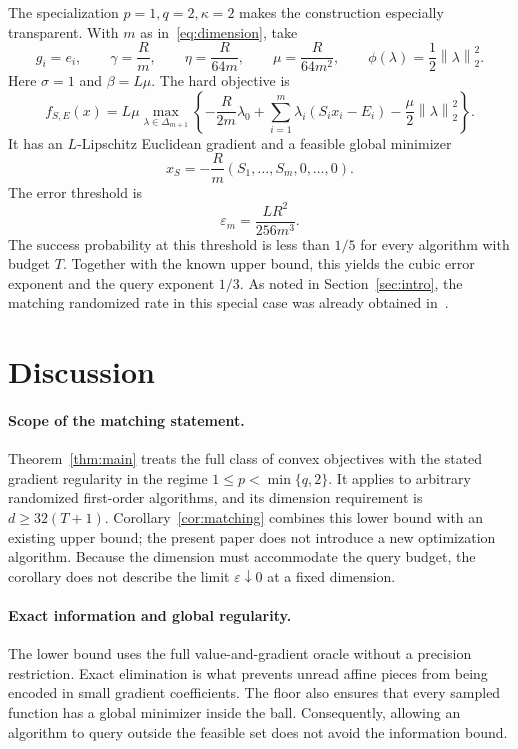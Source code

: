 \documentclass[11pt,a4paper]{article}
\theoremstyle{definition}
\theoremstyle{remark}
\newcommand{\eps}{\varepsilon}
\newcommand{\norm}[1]{\left\lVert #1\right\rVert}
\begin{document}
The specialization $p=1,q=2,\kappa=2$ makes the construction especially
transparent. With $m$ as in~\eqref{eq:dimension}, take
\[
  g_i=e_i,\qquad
  \gamma=\frac Rm,\qquad
  \eta=\frac{R}{64m},\qquad
  \mu=\frac{R}{64m^2},\qquad
  \phi(\lambda)=\frac12\norm{\lambda}_2^2.
\]
Here $\sigma=1$ and $\beta=L\mu$. The hard objective is
\begin{equation}\label{eq:example}
 f_{S,E}(x)=L\mu\max_{\lambda\in\Delta_{m+1}}
 \left\{-\frac{R}{2m}\lambda_0+
     \sum_{i=1}^m\lambda_i(S_i x_i-E_i)
     -\frac\mu2\norm{\lambda}_2^2\right\}.
\end{equation}
It has an $L$-Lipschitz Euclidean gradient and a feasible global minimizer
\[
    x_S=-\frac Rm(S_1,\ldots,S_m,0,\ldots,0).
\]
The error threshold is
\begin{equation}\label{eq:cubic}
    \eps_m=\frac{LR^2}{256m^3}.
\end{equation}
The success probability at this threshold is less than $1/5$ for every
algorithm with budget $T$. Together with the known upper bound, this yields
the cubic error exponent and the query exponent $1/3$.
As noted in Section~\ref{sec:intro}, the matching randomized rate in this
special case was already obtained in~\cite{LG26}.

\section{Discussion}\label{sec:discussion}

\paragraph{Scope of the matching statement.}
Theorem~\ref{thm:main} treats the full class of convex objectives with the
stated gradient regularity in the regime $1\le p<\min\{q,2\}$.
It applies to arbitrary randomized first-order algorithms, and its dimension
requirement is $d\ge32(T+1)$. Corollary~\ref{cor:matching} combines this lower
bound with an existing upper bound; the present paper does not introduce a
new optimization algorithm. Because the dimension must accommodate the
query budget, the corollary does not describe the limit $\eps\downarrow0$
at a fixed dimension.

\paragraph{Exact information and global regularity.}
The lower bound uses the full value-and-gradient oracle without a precision
restriction. Exact elimination is what prevents unread affine pieces from
being encoded in small gradient coefficients. The floor also ensures that
every sampled function has a global minimizer inside the ball. Consequently,
allowing an algorithm to query outside the feasible set does not avoid the
information bound.
\end{document}

